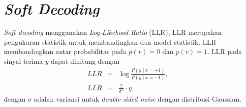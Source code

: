 \section{\textit{Soft Decoding}}
\textit{Soft decoding} menggunakan \textit{Log-Likehood Ratio} (LLR), LLR merupakan pengukuran statistik untuk membandingkan dua model statistik. LLR membandingkan antar probabilitas pada $p(v)=0$ dan $p(v)=1$. LLR pada sinyal terima $y$ dapat dihitung dengan
\begin{eqnarray}
LLR &=& \log\frac{P\left ( y\mid x=+1 \right )}{P\left ( y\mid x=-1   \right )}, \nonumber \\
LLR &=& \frac{2}{\sigma ^2}\cdot y
\end{eqnarray}
dengan $\sigma$ adalah variansi untuk \textit{double-sided noise} dengan distribusi Gaussian.
% 



